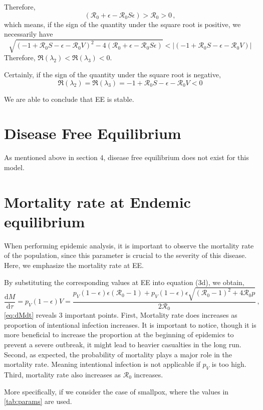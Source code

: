 \documentclass[12pt]{article}
\newcommand\dbyd[2]{\frac{\mathrm d{#1}}{\mathrm d{#2}}}
\newcommand{\R}{\mathcal{R}}
\newcommand{\pmV}{p_{V}}
\begin{document}
Therefore,
\begin{equation}
(\R_0+\epsilon-\R_0 S\epsilon)>\R_0 >0\,,
\end{equation}
which means, if the sign of the quantity under the square root is positive, we necessarily have
\begin{equation}
\sqrt{(-1+\R_0 S-\epsilon-\R_0 V)^2-4(\R_0+\epsilon-\R_0 S\epsilon)}<|(-1+\R_0 S-\epsilon-\R_0 V)|
\end{equation}
Therefore, $\Re(\lambda_2)<\Re(\lambda_3)<0$.

Certainly, if the sign of the quantity under the square root is negative,
\begin{equation}
\Re(\lambda_2)=\Re(\lambda_3)=-1+\R_0 S-\epsilon-\R_0 V<0
\end{equation}

We are able to conclude that EE is stable.
\section{Disease Free Equilibrium}
As mentioned above in section 4, disease free equilibrium does not exist for this model.
\section{Mortality rate at Endemic equilibrium}
When performing epidemic analysis, it is important to observe the mortality rate of the population, since this parameter is crucial to the severity of this disease. Here, we emphasize the mortality rate at EE.

By substituting the corresponding values at EE into equation (3d), we obtain,
\begin{equation}
\dbyd{M}{\tau}=\pmV(1-\epsilon)V=\frac{\pmV(1-\epsilon)\epsilon(\R_0 -1)+ \pmV(1-\epsilon)\epsilon \sqrt{(\R_0-1)^2+4\R_0 p}}{2\R_0}\,, \label{eq:dMdt}
\end{equation}
\autoref{eq:dMdt} reveals 3 important points. First, Mortality rate does increases as proportion of intentional infection increases. It is important to notice, though it is more beneficial to increase the proportion at the beginning of epidemics to prevent a severe outbreak, it might lead to heavier casualties in the long run. Second, as expected, the probability of mortality plays a major role in the mortality rate. Meaning intentional infection is not applicable if $\pmV$ is too high. Third, mortality rate also increases as $\R_0$ increases. 

More specifically, if we consider the case of smallpox, where the values in \autoref{tab:params} are used.
\end{document}
